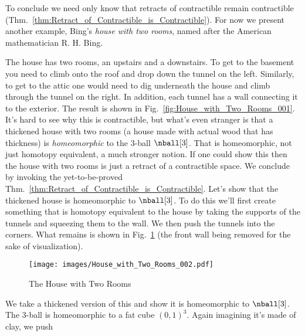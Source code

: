         \par\vspace{2.5ex}
        To conclude we need only know that retracts of contractible
        remain contractible
        (Thm.~\ref{thm:Retract_of_Contractible_is_Contractible}). For
        now we present another example, Bing's
        \textit{house with two rooms}, named after
        the American mathematician R. H. Bing.
        \par\hfill\par
        The house has two rooms, an upstairs and a downstairs. To get to
        the basement you need to climb onto the roof and drop down the
        tunnel on the left. Similarly, to get to the attic one would
        need to dig underneath the house and climb through the tunnel on
        the right. In addition, each tunnel has a wall connecting it to
        the exterior. The result is shown in
        Fig.~\ref{fig:House_with_Two_Rooms_001}. It's hard to see why
        this is contractible, but what's even stranger is that a
        thickened house with two rooms (a house made with actual wood
        that has thickness) is \textit{homeomorphic} to the 3-ball
        $\nball[3]$. That is homeomorphic, not just homotopy equivalent,
        a much stronger notion. If one could show this then the house
        with two rooms is just a retract of a contractible space. We
        conclude by invoking the yet-to-be-proved
        Thm.~\ref{thm:Retract_of_Contractible_is_Contractible}. Let's
        show that the thickened house is homeomorphic to $\nball[3]$. To
        do this we'll first create something that is homotopy equivalent
        to the house by taking the supports of the tunnels and squeezing
        them to the wall. We then push the tunnels into the corners.
        What remains is shown in Fig.~\ref{fig:House_with_Two_Rooms_002}
        (the front wall being removed for the sake of visualization).
        \begin{figure}
            \centering
            \captionsetup{type=figure}
            \texttt{[image: images/House\_with\_Two\_Rooms\_002.pdf]}
            \caption{The House with Two Rooms}
            \label{fig:House_with_Two_Rooms_002}
        \end{figure}
        \par\hfill\par
        We take a thickened version of this and show it is homeomorphic
        to $\nball[3]$. The 3-ball is homeomorphic to a fat cube
        $(0,1)^{3}$. Again imagining it's made of clay, we push
